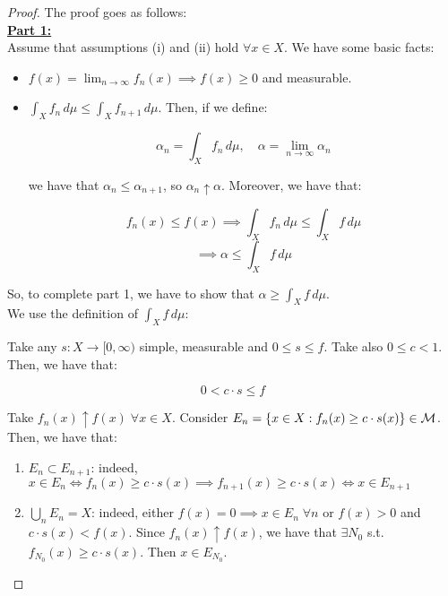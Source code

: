 \begin{proof}
    The proof goes as follows:\\

    \textbf{\underline{Part 1:}}\\

    Assume that assumptions (i) and (ii) hold $\forall x \in X$. We have some basic facts:

    \begin{itemize}
        \item $f(x) = \lim_{n \to \infty} f_n(x) \implies f(x) \geq 0$ and measurable.
        
        \item $\int_{X} f_n \, d\mu \leq \int_{X} f_{n+1} \, d\mu$. Then, if we define:
        
        $$\alpha_n = \int_{X} f_n \, d\mu, \quad \alpha = \lim_{n \to \infty} \alpha_n$$

        we have that $\alpha_n \leq \alpha_{n+1}$, so $\alpha_n \uparrow \alpha$. Moreover,
        we have that:

        $$f_n(x) \leq f(x) \implies \int_{X} f_n \, d\mu \leq \int_{X} f \, d\mu$$
        $$\implies \alpha \leq \int_{X} f \, d\mu$$
    \end{itemize}

    So, to complete part 1, we have to show that $\alpha \geq \int_{X} f \, d\mu$.\\

    We use the definition of $\int_X f \, d\mu$:

    Take any $s: X \to [0, \infty)$ simple, measurable and $0 \leq s \leq f$. Take also $0 \leq c < 1$.
    Then, we have that:

    $$0 < c \cdot s \leq f$$

    Take $f_n(x) \uparrow f(x) \; \forall x \in X$. Consider $E_n = \{x \in X: f_n(x) \geq c \cdot s(x)\} \in \mathcal{M}$.
    Then, we have that:

    \begin{enumerate}[label=(\alph*)]
        \item $E_n \subset E_{n+1}$: indeed, $x \in E_n \iff f_n(x) \geq c \cdot s(x) \implies f_{n+1}(x) \geq c \cdot s(x) \iff x \in E_{n+1}$
        
        \item $\bigcup_n E_n = X$: indeed, either $f(x) = 0 \implies x \in E_n \; \forall n$ or $f(x) > 0$ and 
        $c \cdot s(x) < f(x)$. Since $f_n(x) \uparrow f(x)$, we have that $\exists N_0$ s.t. $f_{N_0}(x) \geq c \cdot s(x)$.
        Then $x \in E_{N_0}$.
    \end{enumerate}


\end{proof}
